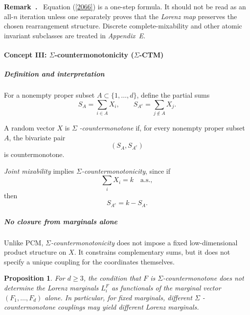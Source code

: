 \documentclass[onecolumn]{article}
\newtheorem{definition}[theorem]{Definition}
\let\olddefinition\definition
\let\endolddefinition\enddefinition
\renewenvironment{definition}{\olddefinition\normalfont}{\endolddefinition}
\newtheorem{proposition}[theorem]{Proposition}
\newenvironment{remark}{  \refstepcounter{theorem}  \par\medskip\noindent\textbf{Remark~\thetheorem.}\rmfamily\ }{\par\medskip}
\begin{document}
\begin{remark}
\medskip Equation (\ref{2066}) is a one-step formula. It should not be read
as an all-$n$ iteration unless one separately proves that the \textit{Lorenz
map} preserves the chosen rearrangement structure. Discrete
complete-mixability and other atomic invariant subclasses are treated in 
\textit{Appendix~E}. \medskip
\end{remark}

\paragraph{Concept III: $\Sigma $-countermonotonicity ($\Sigma $-CTM)}

\subparagraph{Definition and interpretation}

For a nonempty proper subset $A\subset \{1,\ldots ,d\}$, define the partial
sums 
\begin{equation}
S_{A}=\sum_{i\in A}X_{i},\qquad S_{A^{c}}=\sum_{j\notin A}X_{j}.
\label{2072}
\end{equation}

\begin{definition}
\medskip \noindent \label{SigmaCTM} A random vector $X$ is $\Sigma $\textit{%
-countermonotone} if, for every nonempty proper subset $A$, the bivariate
pair 
\begin{equation*}
(S_{A},S_{A^{c}})
\end{equation*}%
is countermonotone. \medskip

\textit{Joint mixability} implies $\Sigma $\textit{-countermonotonicity},
since if 
\begin{equation*}
\sum_{i}X_{i}=k\quad \text{a.s.},
\end{equation*}%
then 
\begin{equation*}
S_{A^{c}}=k-S_{A}.
\end{equation*}
\end{definition}

\subparagraph{No closure from marginals alone}

Unlike PCM, $\Sigma $\textit{-countermonotonicity} does not impose a fixed
low-dimensional product structure on $X$. It constrains complementary sums,
but it does not specify a unique coupling for the coordinates themselves.

\begin{proposition}
\medskip \noindent \label{Sigma-noclosure} For $d\geq 3$, the condition that 
$F$ is $\Sigma $-countermonotone does not determine the Lorenz marginals $%
L_{i}^{F}$ as functionals of the marginal vector $(F_{1},\ldots ,F_{d})$
alone. In particular, for fixed marginals, different $\Sigma $%
-countermonotone couplings may yield different Lorenz marginals. \medskip
\end{proposition}
\end{document}
